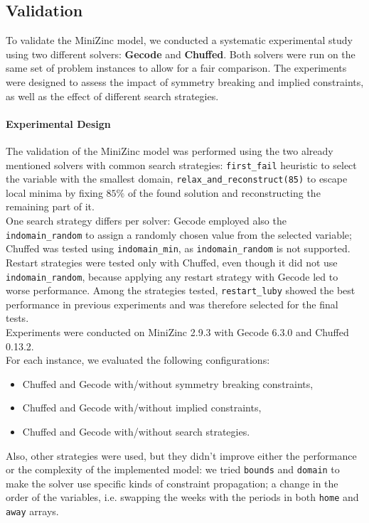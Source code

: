\documentclass[11pt]{article}
\begin{document}
\subsection{Validation}

To validate the MiniZinc model, we conducted a systematic experimental study using two different solvers: \textbf{Gecode} and \textbf{Chuffed}. Both solvers were run on the same set of problem instances to allow for a fair comparison. The experiments were designed to assess the impact of symmetry breaking and implied constraints, as well as the effect of different search strategies.

\paragraph{Experimental Design}
The validation of the MiniZinc model was performed using the two already mentioned solvers with common search strategies: \texttt{first\_fail} heuristic to select the variable with the smallest domain, \texttt{relax\_and\_reconstruct(85)} to escape local minima by fixing $85\%$ of the found solution and reconstructing the remaining part of it. \\One search strategy differs per solver: Gecode employed also the \texttt{indomain\_random} to assign a randomly chosen value from the selected variable; Chuffed was tested using \texttt{indomain\_min}, as \texttt{indomain\_random} is not supported. \\
Restart strategies were tested only with Chuffed, even though it did not use \texttt{indomain\_random}, because applying any restart strategy with Gecode led to worse performance. Among the strategies tested, \texttt{restart\_luby} showed the best performance in previous experiments and was therefore selected for the final tests. \\
Experiments were conducted on MiniZinc 2.9.3 with Gecode 6.3.0 and Chuffed 0.13.2.\\
For each instance, we evaluated the following configurations:
\begin{itemize}
    \item Chuffed and Gecode with/without symmetry breaking constraints,
    \item Chuffed and Gecode with/without implied constraints,
    \item Chuffed and Gecode with/without search strategies.
\end{itemize} 
Also, other strategies were used, but they didn't improve either the performance or the complexity of the implemented model: we tried \texttt{bounds} and \texttt{domain} to make the solver use specific kinds of constraint propagation; a change in the order of the variables, i.e. swapping the weeks with the periods in both \texttt{home} and \texttt{away} arrays.
\end{document}
